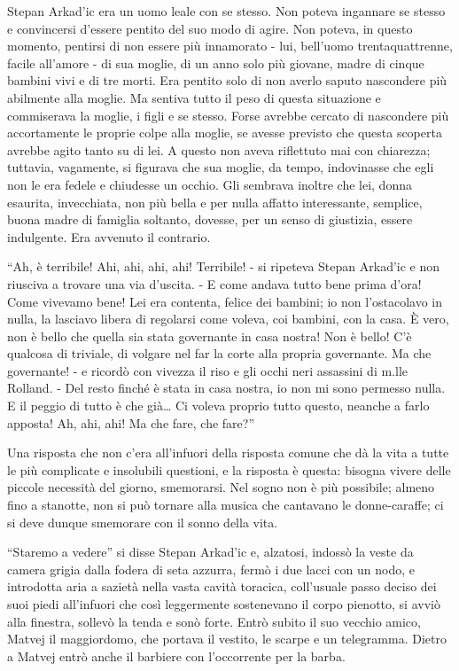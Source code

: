 \label{ii} 

Stepan Arkad'ic era un uomo leale con se stesso. Non poteva ingannare se stesso e convincersi d'essere pentito del suo modo di agire. Non poteva, in questo momento, pentirsi di non essere più innamorato - lui, bell'uomo trentaquattrenne, facile all'amore - di sua moglie, di un anno solo più giovane, madre di cinque bambini vivi e di tre morti. Era pentito solo di non averlo saputo nascondere più abilmente alla moglie. Ma sentiva tutto il peso di questa situazione e commiserava la moglie, i figli e se stesso. Forse avrebbe cercato di nascondere più accortamente le proprie colpe alla moglie, se avesse previsto che questa scoperta avrebbe agito tanto su di lei. A questo non aveva riflettuto mai con chiarezza; tuttavia, vagamente, si figurava che sua moglie, da tempo, indovinasse che egli non le era fedele e chiudesse un occhio. Gli sembrava inoltre che lei, donna esaurita, invecchiata, non più bella e per nulla affatto interessante, semplice, buona madre di famiglia soltanto, dovesse, per un senso di giustizia, essere indulgente. Era avvenuto il contrario. 

``Ah, è terribile! Ahi, ahi, ahi, ahi! Terribile! - si ripeteva Stepan Arkad'ic e non riusciva a trovare una via d'uscita. - E come andava tutto bene prima d'ora! Come vivevamo bene! Lei era contenta, felice dei bambini; io non l'ostacolavo in nulla, la lasciavo libera di regolarsi come voleva, coi bambini, con la casa. È vero, non è bello che quella sia stata governante in casa nostra! Non è bello! C'è qualcosa di triviale, di volgare nel far la corte alla propria governante. Ma che governante! - e ricordò con vivezza il riso e gli occhi neri assassini di m.lle Rolland. - Del resto finché è stata in casa nostra, io non mi sono permesso nulla. E il peggio di tutto è che già\ldots{} Ci voleva proprio tutto questo, neanche a farlo apposta! Ah, ahi, ahi! Ma che fare, che fare?'' 

Una risposta che non c'era all'infuori della risposta comune che dà la vita a tutte le più complicate e insolubili questioni, e la risposta è questa: bisogna vivere delle piccole necessità del giorno, smemorarsi. Nel sogno non è più possibile; almeno fino a stanotte, non si può tornare alla musica che cantavano le donne-caraffe; ci si deve dunque smemorare con il sonno della vita. 

``Staremo a vedere'' si disse Stepan Arkad'ic e, alzatosi, indossò la veste da camera grigia dalla fodera di seta azzurra, fermò i due lacci con un nodo, e introdotta aria a sazietà nella vasta cavità toracica, coll'usuale passo deciso dei suoi piedi all'infuori che così leggermente sostenevano il corpo pienotto, si avviò alla finestra, sollevò la tenda e sonò forte. Entrò subito il suo vecchio amico, Matvej il maggiordomo, che portava il vestito, le scarpe e un telegramma. Dietro a Matvej entrò anche il barbiere con l'occorrente per la barba. 


